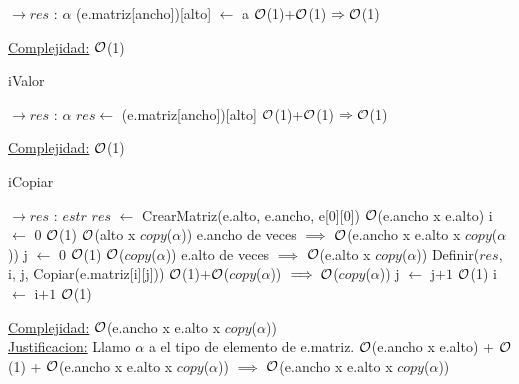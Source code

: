 \begin{Representacion}
\begin{Algoritmos}
\begin{algorithm}[H]
		\begin{algorithmic}[1]
			 $\to res$ : $\alpha$
			\State (e.matriz[ancho])[alto] $\leftarrow$ a \Comment $\mathcal{O}$(1)+$\mathcal{O}$(1) $\Rightarrow \mathcal{O}$(1)
			\EndProcedure
		\end{algorithmic}
		\underline{Complejidad:} $\mathcal{O}$(1)
		
	\end{algorithm}
	
	\begin{algorithm}[H]
		\caption{iValor}
		
		\begin{algorithmic}[1]
			 $\to res$ : $\alpha$
			\State $res \leftarrow$ (e.matriz[ancho])[alto] \Comment $\mathcal{O}$(1)+$\mathcal{O}$(1) $\Rightarrow \mathcal{O}$(1)
			\EndProcedure
		\end{algorithmic}
		\underline{Complejidad:} $\mathcal{O}$(1)
		
	\end{algorithm}
	
	\begin{algorithm}[H]
		\caption{iCopiar}
		
		\begin{algorithmic}[1]
			 $\to res$ : $estr$
			\State $res$ $\leftarrow$ CrearMatriz(e.alto, e.ancho, e[0][0]) \Comment $\mathcal{O}$(e.ancho x e.alto)
			\State i $\leftarrow$ $0$ \Comment $\mathcal{O}$(1)
			 \Comment $\mathcal{O}$(alto x $copy$($\alpha$)) e.ancho de veces $\implies$ $\mathcal{O}$(e.ancho x e.alto x $copy$($\alpha$))
				\State j $\leftarrow$ $0$ \Comment $\mathcal{O}$(1)
				 \Comment $\mathcal{O}$($copy$($\alpha$)) e.alto de veces $\implies$  $\mathcal{O}$(e.alto x $copy$($\alpha$))
					\State Definir($res$, i, j, Copiar(e.matriz[i][j])) \Comment $\mathcal{O}$(1)+$\mathcal{O}$($copy$($\alpha$)) $\implies \mathcal{O}$($copy$($\alpha$))
					\State j $\leftarrow$ j$+1$ \Comment $\mathcal{O}$(1)
				\EndWhile
				\State i $\leftarrow$ i$+1$ \Comment $\mathcal{O}$(1)
			\EndWhile
			\EndProcedure
		\end{algorithmic}
		\underline{Complejidad:} $\mathcal{O}$(e.ancho x e.alto x $copy$($\alpha$))
		\\
		\underline{Justificacion:} Llamo $\alpha$ a el tipo de elemento de e.matriz. $\mathcal{O}$(e.ancho x e.alto) + $\mathcal{O}$(1) + $\mathcal{O}$(e.ancho x e.alto x $copy$($\alpha$)) $\implies$ $\mathcal{O}$(e.ancho x e.alto x $copy$($\alpha$))
		

\end{algorithm}
\end{Algoritmos}
\end{Representacion}
